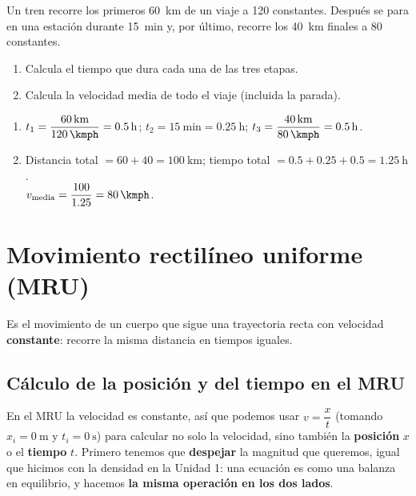 \begin{exercise}
    Un tren recorre los primeros \qty{60}{\km} de un viaje a \qty{120}{\kmph} constantes. Después se para en una estación durante \qty{15}{\minute} y, por último, recorre los \qty{40}{\km} finales a \qty{80}{\kmph} constantes.
    \begin{enumerate}[label=\letraminuscula]
        \item Calcula el tiempo que dura cada una de las tres etapas.
        \item Calcula la velocidad media de todo el viaje (incluida la parada).
    \end{enumerate}
    \begin{solu}
        \begin{enumerate}[label=\alph*)]
            \item \(t_1 = \dfrac{\qty{60}{\km}}{\qty{120}{\kmph}} = \qty{0.5}{\hour}\); \quad \(t_2 = \qty{15}{\minute} = \qty{0.25}{\hour}\); \quad \(t_3 = \dfrac{\qty{40}{\km}}{\qty{80}{\kmph}} = \qty{0.5}{\hour}\).
            \item Distancia total \(= 60 + 40 = \qty{100}{\km}\); tiempo total \(= 0.5 + 0.25 + 0.5 = \qty{1.25}{\hour}\). \\
            \(v_{\text{media}} = \dfrac{100}{1.25} = \qty{80}{\kmph}\).
        \end{enumerate}
    \end{solu}
\end{exercise}


\section{Movimiento rectilíneo uniforme (MRU)}

\begin{definition}
    Es el movimiento de un cuerpo que sigue una trayectoria recta con velocidad \textbf{constante}: recorre la misma distancia en tiempos iguales.
\end{definition}

\subsection{Cálculo de la posición y del tiempo en el MRU}

En el MRU la velocidad es constante, así que podemos usar \(v = \dfrac{x}{t}\) (tomando \(x_i = \qty{0}{\m}\) y \(t_i = \qty{0}{\s}\)) para calcular no solo la velocidad, sino también la \textbf{posición} \(x\) o el \textbf{tiempo} \(t\). Primero tenemos que \textbf{despejar} la magnitud que queremos, igual que hicimos con la densidad en la Unidad 1: una ecuación es como una balanza en equilibrio, y hacemos \textbf{la misma operación en los dos lados}.

